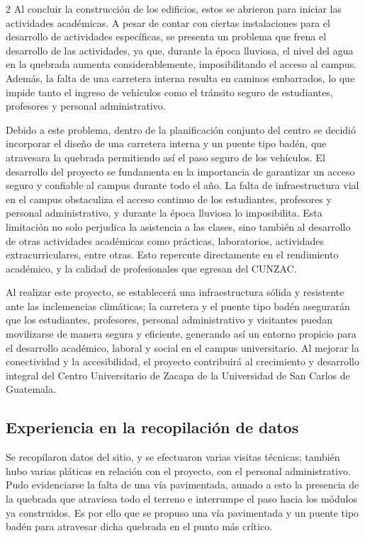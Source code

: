 \documentclass[12pt,spanish,Letterpaper,openany]{book}
\begin{document}
\begin {multicols}{2}
Al concluir la construcción de los edificios, estos se abrieron para iniciar las actividades académicas. A pesar de contar con ciertas instalaciones para el desarrollo de actividades específicas, se presenta un problema que frena el desarrollo de las actividades, ya que, durante la época lluviosa, el nivel del agua en la quebrada aumenta considerablemente, imposibilitando el acceso al campus. Además, la falta de una carretera interna resulta en caminos embarrados, lo que impide tanto el ingreso de vehículos como el tránsito seguro de estudiantes, profesores y personal administrativo.

Debido a este problema, dentro de la planificación conjunto del centro se decidió incorporar el diseño de una carretera interna y un puente tipo badén, que atravesara la quebrada permitiendo así el paso seguro de los vehículos. El desarrollo del proyecto se fundamenta en la importancia de garantizar un acceso seguro y confiable al campus durante todo el año. La falta de infraestructura vial en el campus obstaculiza el acceso continuo de los estudiantes, profesores y personal administrativo, y durante la época lluviosa lo imposibilita. Esta limitación no solo perjudica la asistencia a las clases, sino también al desarrollo de otras actividades académicas como prácticas, laboratorios, actividades extracurriculares, entre otras. Esto repercute directamente en el rendimiento académico, y la calidad de profesionales que egresan del CUNZAC.

Al realizar este proyecto, se establecerá una infraestructura sólida y resistente ante las inclemencias climáticas; la carretera y el puente tipo badén asegurarán que los estudiantes, profesores, personal administrativo y visitantes puedan movilizarse de manera segura y eficiente, generando así un entorno propicio para el desarrollo académico, laboral y social en el campus universitario. Al mejorar la conectividad y la accesibilidad, el proyecto contribuirá al crecimiento y desarrollo integral del Centro Universitario de Zacapa de la Universidad de San Carlos de Guatemala.

\hypertarget{experiencia-en-la-recopilaciuxf3n-de-datos}{%
\subsection{Experiencia en la recopilación de datos}\label{experiencia-en-la-recopilaciuxf3n-de-datos}}

Se recopilaron datos del sitio, y se efectuaron varias visitas técnicas; también hubo varias pláticas en relación con el proyecto, con el personal administrativo. Pudo evidenciarse la falta de una vía pavimentada, aunado a esto la presencia de la quebrada que atraviesa todo el terreno e interrumpe el paso hacia los módulos ya construidos. Es por ello que se propuso una vía pavimentada y un puente tipo badén para atravesar dicha quebrada en el punto más crítico.


\end{multicols}
\end{document}
